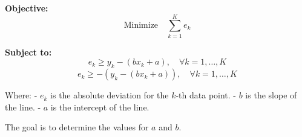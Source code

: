 \documentclass{article}
\begin{document}
\textbf{Objective:}
\[
\text{Minimize} \quad \sum_{k=1}^{K} e_k
\]

\textbf{Subject to:}
\[
e_k \geq y_k - (bx_k + a), \quad \forall k = 1, \ldots, K
\]
\[
e_k \geq -(y_k - (bx_k + a)), \quad \forall k = 1, \ldots, K
\]

Where:
- \( e_k \) is the absolute deviation for the \( k \)-th data point.
- \( b \) is the slope of the line.
- \( a \) is the intercept of the line.

The goal is to determine the values for \( a \) and \( b \).
\end{document}
